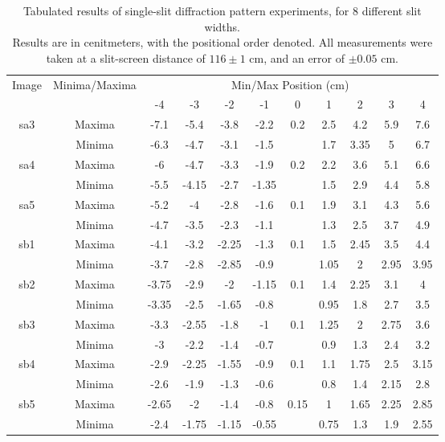 \documentclass[a4paper]{article}
\begin{document}
\begin{table}[h!]
  \centering
  \begin{tabular}{|c|c|ccccccccc|}
  \hline
  \multirow{2}{*}{Image} & \multirow{2}{*}{Minima/Maxima} & \multicolumn{9}{c|}{Min/Max Position (cm)}               \\
                      &          & -4    & -3    & -2    & -1    & 0    & 1    & 2    & 3    & 4    \\\hline\hline
  \multirow{2}{*}{sa3} & Maxima  & -7.1  & -5.4  & -3.8  & -2.2  & 0.2  & 2.5  & 4.2  & 5.9  & 7.6  \\
                       & Minima  & -6.3  & -4.7  & -3.1  & -1.5  &      & 1.7  & 3.35 & 5    & 6.7  \\\hline
  \multirow{2}{*}{sa4} & Maxima  & -6    & -4.7  & -3.3  & -1.9  & 0.2  & 2.2  & 3.6  & 5.1  & 6.6  \\
                       & Minima  & -5.5  & -4.15 & -2.7  & -1.35 &      & 1.5  & 2.9  & 4.4  & 5.8  \\\hline
  \multirow{2}{*}{sa5} & Maxima  & -5.2  & -4    & -2.8  & -1.6  & 0.1  & 1.9  & 3.1  & 4.3  & 5.6  \\
                       & Minima  & -4.7  & -3.5  & -2.3  & -1.1  &      & 1.3  & 2.5  & 3.7  & 4.9  \\\hline
  \multirow{2}{*}{sb1} & Maxima  & -4.1  & -3.2  & -2.25 & -1.3  & 0.1  & 1.5  & 2.45 & 3.5  & 4.4  \\
                       & Minima  & -3.7  & -2.8  & -2.85 & -0.9  &      & 1.05 & 2    & 2.95 & 3.95 \\\hline
  \multirow{2}{*}{sb2} & Maxima  & -3.75 & -2.9  & -2    & -1.15 & 0.1  & 1.4  & 2.25 & 3.1  & 4    \\
                       & Minima  & -3.35 & -2.5  & -1.65 & -0.8  &      & 0.95 & 1.8  & 2.7  & 3.5  \\\hline
  \multirow{2}{*}{sb3} & Maxima  & -3.3  & -2.55 & -1.8  & -1    & 0.1  & 1.25 & 2    & 2.75 & 3.6  \\
                       & Minima  & -3    & -2.2  & -1.4  & -0.7  &      & 0.9  & 1.3  & 2.4  & 3.2  \\\hline
  \multirow{2}{*}{sb4} & Maxima  & -2.9  & -2.25 & -1.55 & -0.9  & 0.1  & 1.1  & 1.75 & 2.5  & 3.15 \\
                       & Minima  & -2.6  & -1.9  & -1.3  & -0.6  &      & 0.8  & 1.4  & 2.15 & 2.8  \\\hline
  \multirow{2}{*}{sb5} & Maxima  & -2.65 & -2    & -1.4  & -0.8  & 0.15 & 1    & 1.65 & 2.25 & 2.85 \\
                       & Minima  & -2.4  & -1.75 & -1.15 & -0.55 &      & 0.75 & 1.3  & 1.9  & 2.55 \\\hline
  \end{tabular}
  \captionsetup{justification=centering}
  \caption{\label{tab:ss_tab}Tabulated results of single-slit diffraction pattern experiments, for 8 different slit widths.\\ Results are in cenitmeters, with the positional order denoted. All measurements were taken at a slit-screen distance of $116\pm1$ cm, and an error of $\pm 0.05$ cm.}
\end{table}
\end{document}
